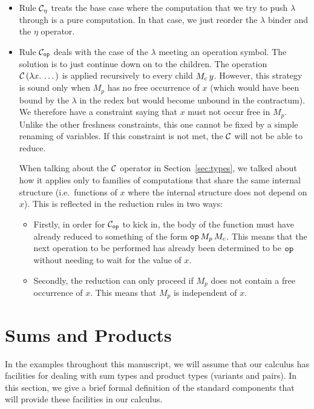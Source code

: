 \begin{itemize}
\item Rule $\mathcal{C}_\eta$ treats the base case where the computation that we
  try to push $\lambda$ through is a pure computation. In that case, we
  just reorder the $\lambda$ binder and the $\eta$ operator.

\item Rule $\mathcal{C}_{\mathtt{op}}$ deals with the case of the $\lambda$ meeting an
  operation symbol. The solution is to just continue down on to the
  children. The operation $\mathcal{C}\,(\lambda x.\, \dots)$ is applied
  recursively to every child $M_c\,y$. However, this strategy is sound
  only when $M_p$ has no free occurrence of $x$ (which would have been
  bound by the $\lambda$ in the redex but would become unbound in the
  contractum). We therefore have a constraint saying that $x$ must not
  occur free in $M_p$. Unlike the other freshness constraints, this one
  cannot be fixed by a simple renaming of variables. If this constraint is
  not met, the $\mathcal{C}$ will not be able to reduce.

  When talking about the $\mathcal{C}$ operator in Section~\ref{sec:types}, we
  talked about how it applies only to families of computations that share
  the same internal structure (i.e.\ functions of $x$ where the internal
  structure does not depend on $x$). This is reflected in the reduction
  rules in two ways:
  \begin{itemize}
  \item Firstly, in order for $\mathcal{C}_{\mathtt{op}}$ to kick in, the body of the
    function must have already reduced to something of the form
    $\mathtt{op}\,M_p\,M_c$. This means that the next operation to be
    performed has already been determined to be $\mathtt{op}$ without needing
    to wait for the value of $x$.
  \item Secondly, the reduction can only proceed if $M_p$ does not contain
    a free occurrence of $x$. This means that $M_p$ is independent of $x$.
  \end{itemize}
\end{itemize}


\section{Sums and Products}
\label{sec:sums-and-products}

In the examples throughout this manuscript, we will assume that our
calculus has facilities for dealing with sum types and product types
(variants and pairs). In this section, we give a brief formal definition of
the standard components that will provide these facilities in our calculus.

